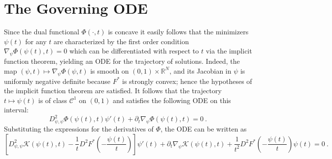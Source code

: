 \documentclass{scrartcl}
\newcommand{\R}{{\mathbb R}}
\theoremstyle{plain}
\theoremstyle{definition}
\begin{document}
\section{The Governing ODE}\label{sec:ode}
Since the dual functional $\Phi(\cdot,t)$ is concave it easily follows that the minimizers $\psi(t)$ for any $t$ are characterized by the first order  condition $\nabla_\psi\Phi(\psi(t),t)=0$ which can be differentiated with respect to $t$ via the implicit function theorem, yielding an ODE for the trajectory of solutions. Indeed, the map $(\psi,t)\mapsto\nabla_\psi\Phi(\psi,t)$ is smooth on $(0,1)\times\R^N$, and its Jacobian in $\psi$ is uniformly negative definite because $F^*$ is strongly convex; hence the hypotheses of the implicit function theorem are satisfied. It follows that the trajectory $t \mapsto \psi(t)$ is of class $\mathcal{C}^1$ on $(0,1)$ and satisfies the following ODE on this interval:
\begin{equation} \label{eq:ODE}
    D^2_{\psi,\psi}\Phi(\psi(t),t) \psi'(t) + \partial_t\nabla_\psi\Phi(\psi(t),t) = 0\ .
\end{equation}
Substituting the expressions for the derivatives of $\Phi$, the ODE can be written as
\begin{equation*}
    \left[D^2_{\psi,\psi} \mathcal{K}(\psi(t),t) -\frac{1}{t}D^2F^*\left(-\frac{\psi(t)}{t} \right)\right] \psi'(t) + \partial_t\nabla_\psi\mathcal{K}(\psi(t),t) + \frac{1}{t^2} D^2F^*\left(-\frac{\psi(t)}{t}\right)\psi(t)=0\ .
\end{equation*}
\end{document}
